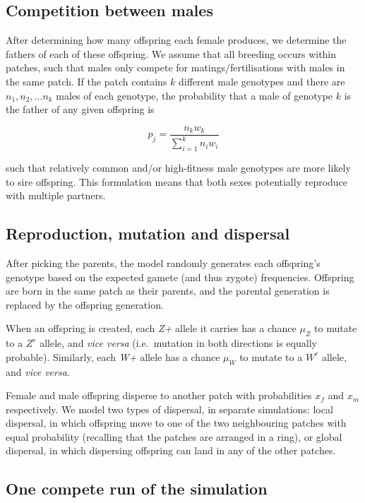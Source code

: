 \documentclass[]{rsos}%
\begin{document}
\hypertarget{competition-between-males}{%
\subsection{Competition between males}\label{competition-between-males}}

After determining how many offspring each female produces, we determine
the fathers of each of these offspring. We assume that all breeding
occurs within patches, such that males only compete for
matings/fertilisations with males in the same patch. If the patch
contains \(k\) different male genotypes and there are
\(n_1, n_2, ... n_k\) males of each genotype, the probability that a
male of genotype \(k\) is the father of any given offspring is

\[p_j = \frac{n_{k}w_k}{\sum_{i=1}^{k}n_{i}w_i}\]

such that relatively common and/or high-fitness male genotypes are more
likely to sire offspring. This formulation means that both sexes
potentially reproduce with multiple partners.

\hypertarget{reproduction-mutation-and-dispersal}{%
\subsection{Reproduction, mutation and
dispersal}\label{reproduction-mutation-and-dispersal}}

After picking the parents, the model randomly generates each offspring's
genotype based on the expected gamete (and thus zygote) frequencies.
Offspring are born in the same patch as their parents, and the parental
generation is replaced by the offspring generation.

When an offspring is created, each \emph{Z+} allele it carries has a
chance \(\mu_Z\) to mutate to a \(Z^r\) allele, and \emph{vice versa}
(i.e.~mutation in both directions is equally probable). Similarly, each
\emph{W+} allele has a chance \(\mu_W\) to mutate to a \(W^r\) allele,
and \emph{vice versa}.

Female and male offspring disperse to another patch with probabilities
\(x_f\) and \(x_m\) respectively. We model two types of dispersal, in
separate simulations: local dispersal, in which offspring move to one of
the two neighbouring patches with equal probability (recalling that the
patches are arranged in a ring), or global dispersal, in which
dispersing offspring can land in any of the other patches.

\hypertarget{one-compete-run-of-the-simulation}{%
\subsection{One compete run of the
simulation}\label{one-compete-run-of-the-simulation}}
\end{document}
